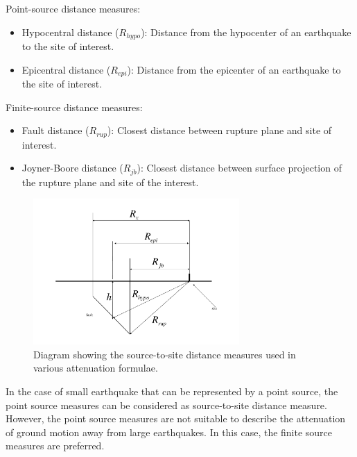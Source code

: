 Point-source distance measures:
\begin{itemize}
\item Hypocentral distance ($R_{hypo}$): Distance from the hypocenter of an earthquake to the site of interest.
\item Epicentral distance ($R_{epi}$): Distance from the epicenter of an earthquake to the site of interest.
\end{itemize}

Finite-source distance measures:
\begin{itemize}
\item Fault distance ($R_{rup}$): Closest distance between rupture plane and site of interest.
\item Joyner-Boore distance ($R_{jb}$): Closest distance between surface projection of the rupture plane and site of the interest.
\end{itemize}
\begin{figure}[htp]
 \centering {}
  
  
\includegraphics[width=0.7\textwidth]{diags/fig-hattn-distance-test2.pdf}
\caption{Diagram showing the source-to-site distance measures used
in various
  attenuation formulae.}
  \label{fig:attn-distances}
\end{figure}
In the case of small earthquake that can be represented by a point
source, the point source measures can be considered as
source-to-site distance measure. However, the point source measures
are not suitable to describe the attenuation of ground motion away
from large earthquakes. In this case, the finite source measures are
preferred.

